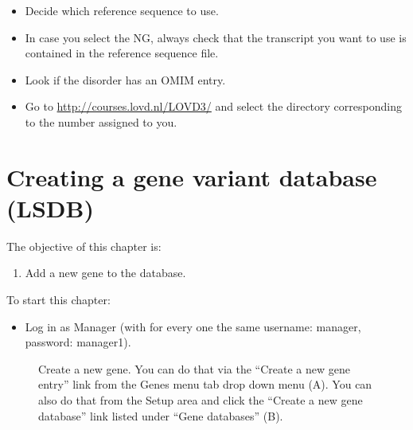 \begin{itemize}
	\item 
	Decide which reference sequence to use.
	\item
	In case you select the NG, 
	always check that the transcript you want to use is contained in the reference sequence file.
	\item
	Look if the disorder has an OMIM entry.
	\item
	Go to \url{http://courses.lovd.nl/LOVD3/} and select the directory corresponding to the number assigned to you.
\end{itemize}










\chapter{Creating a gene variant database (LSDB)}
The objective of this chapter is:
\begin{enumerate}
	\item 
	Add a new gene to the database.
\end{enumerate}
To start this chapter:
\begin{itemize}
	\item 
	Log in as Manager (with for every one the same username: manager, password: \linebreak manager1).
\end{itemize}
\begin{figure}[ht]
  \begin{shaded}
	  \caption{Create a new gene.
	  You can do that via the ``Create a new gene entry'' link from the Genes menu tab drop down menu (A). \newline
	  You can also do that from the Setup area and click the ``Create a new gene database'' link listed under
			``Gene databases'' (B).}
		\label{fig:create_gene_I}
  \end{shaded}
\end{figure}

